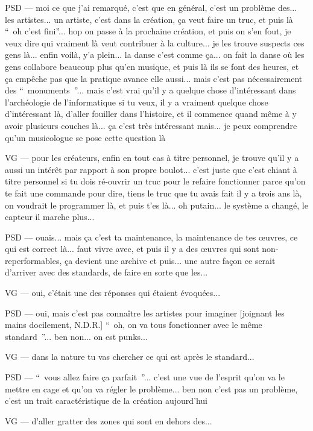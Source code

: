 PSD — moi ce que j'ai remarqué, c'est que en général, c'est un problème des... les artistes... un artiste, c'est dans la création, ça veut faire un truc, et puis là “ oh c'est fini”... hop on passe à la prochaine création, et puis on s'en fout, je veux dire qui vraiment là veut contribuer à la culture... je les trouve suspects ces gens là... enfin voilà, y'a plein... la danse c'est comme ça... on fait la danse où les gens collabore beaucoup plus qu'en musique, et puis là ils se font des heures, et ça empêche pas que la pratique avance elle aussi... mais c'est pas nécessairement des “ monuments ”... mais c'est vrai qu'il y a quelque chose d'intéressant dans l'archéologie de l'informatique si tu veux, il y a vraiment quelque chose d'intéressant là, d'aller fouiller dans l'histoire, et il commence quand même à y avoir plusieurs couches là... ça c'est très intéressant mais... je peux comprendre qu'un musicologue se pose cette question là

VG — pour les créateurs, enfin en tout cas à titre personnel,  je trouve qu'il y a aussi un intérêt par rapport à son propre boulot... c'est juste que c'est chiant à titre personnel si tu dois ré-ouvrir un truc pour le refaire fonctionner parce qu'on te fait une commande pour dire, tiens le truc que tu avais fait il y a trois ans là, on voudrait le programmer là, et puis t'es là... oh putain... le système a changé, le capteur il marche plus...

PSD — ouais... mais ça c'est ta maintenance, la maintenance de tes œuvres, ce qui est correct là... faut vivre avec, et puis il y a des œuvres qui sont non-reperformables, ça devient une archive et puis... une autre façon ce serait d'arriver avec des standards, de faire en sorte que les...

VG — oui, c'était une des réponses qui étaient évoquées...

PSD — oui, mais c'est pas connaître les artistes pour imaginer [joignant les mains docilement, N.D.R.] “ oh, on va tous fonctionner avec le même standard ”... ben non... on est punks...

VG — dans la nature tu vas chercher ce qui est après le standard...

PSD — “ vous allez faire ça parfait ”... c'est une vue de l'esprit qu'on va le mettre en cage et qu'on va régler le problème... ben non c'est pas un problème, c'est un trait caractéristique de la création aujourd'hui

VG — d'aller gratter des zones qui sont en dehors des...

